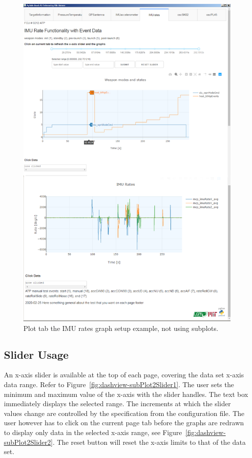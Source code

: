 \begin{figure}[h]
\centering
\includegraphics[height=0.95\textheight]{pic/dashview-config-imuRates-noSubplots}
\caption{Plot tab the IMU rates graph setup example, not using subplots.
\label{fig:dashview-config-imuRates-noSubplots}}
\end{figure}

\clearpage
\subsection{Slider Usage}

An x-axis slider is available at the top of each page, covering the data set x-axis data range. Refer to Figure~\ref{fig:dashview-subPlot2Slider1}. The user sets the minimum and maximum value of the x-axis with the slider handles. The text box immediately displays the selected range. The increments at which the slider values change are controlled by the specification from the configuration file. The user however has to click on the current page tab before the graphs are redrawn to display only data in the selected x-axis range, see Figure~\ref{fig:dashview-subPlot2Slider2}. The reset button will reset the x-axis limits to that of the data set.

